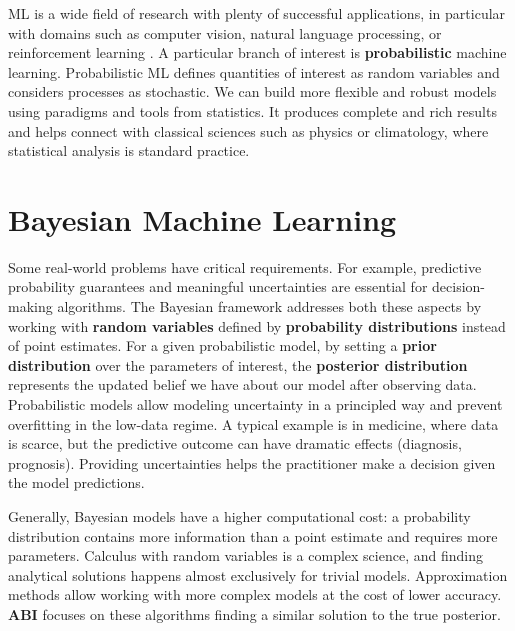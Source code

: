 

\ifpdf
    \graphicspath{{chapters/1_introduction/figures/}}
\else
    \graphicspath{{1_introduction/figures/EPS/}{1_introduction/figures/}}
\fi

\ac{ML} is a wide field of research with plenty of successful applications, in particular with domains such as computer vision, natural language processing, or reinforcement learning \cite{jordan2015machine}.
A particular branch of interest is \textbf{probabilistic} machine learning.
Probabilistic \ac{ML} defines quantities of interest as random variables and considers processes as stochastic.
We can build more flexible and robust models using paradigms and tools from statistics.
It produces complete and rich results and helps connect with classical sciences such as physics or climatology, where statistical analysis is standard practice.

\section{Bayesian Machine Learning}

Some real-world problems have critical requirements.
For example, predictive probability guarantees and meaningful uncertainties are essential for decision-making algorithms.
The Bayesian framework addresses both these aspects by working with \textbf{random variables} defined by \textbf{probability distributions} instead of point estimates.
For a given probabilistic model, by setting a \textbf{prior distribution} over the parameters of interest, the \textbf{posterior distribution} represents the updated belief we have about our model after observing data.
Probabilistic models allow modeling uncertainty in a principled way and prevent overfitting in the low-data regime.
A typical example is in medicine, where data is scarce, but the predictive outcome can have dramatic effects (diagnosis, prognosis).
Providing uncertainties helps the practitioner make a decision given the model predictions.

Generally, Bayesian models have a higher computational cost: a probability distribution contains more information than a point estimate and requires more parameters.
Calculus with random variables is a complex science, and finding analytical solutions happens almost exclusively for trivial models.
Approximation methods allow working with more complex models at the cost of lower accuracy. 
\textbf{\ac{ABI}} focuses on these algorithms finding a similar solution to the true posterior.

